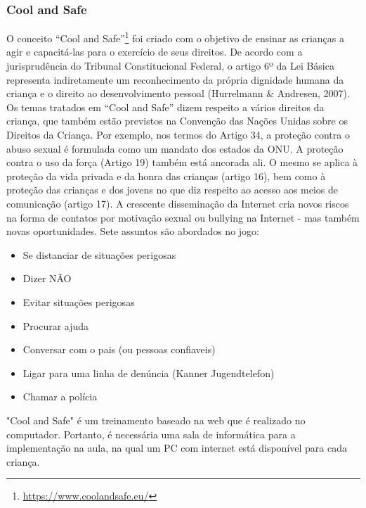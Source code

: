 



\newpage

\subsubsection{Cool and Safe}\label{sssec:CeS}


O conceito “Cool and Safe”\footnote{\url{https://www.coolandsafe.eu/}}  foi criado com o objetivo de ensinar as crianças a agir e capacitá-las para o exercício de seus direitos. De acordo com a jurisprudência do Tribunal Constitucional Federal, o artigo 6º da Lei Básica representa indiretamente um reconhecimento da própria dignidade humana da criança e o direito ao desenvolvimento pessoal (Hurrelmann \& Andresen, 2007). Os temas tratados em “Cool and Safe” dizem respeito a vários direitos da criança, que também estão previstos na Convenção das Nações Unidas sobre os Direitos da Criança. Por exemplo, nos termos do Artigo 34, a proteção contra o abuso sexual é formulada como um mandato dos estados da ONU. A proteção contra o uso da força (Artigo 19) também está ancorada ali. O mesmo se aplica à proteção da vida privada e da honra das crianças (artigo 16), bem como à proteção das crianças e dos jovens no que diz respeito ao acesso aos meios de comunicação (artigo 17). A crescente disseminação da Internet cria novos riscos na forma de contatos por motivação sexual ou bullying na Internet - mas também novas oportunidades. Sete assuntos são abordados no jogo:

\begin{itemize}
  \item Se distanciar de situações perigosas
  \item Dizer NÃO
  \item Evitar situações perigosas
  \item Procurar ajuda
  \item Conversar com o pais (ou pessoas confiaveis)
  \item Ligar para uma linha de denúncia (Kanner Jugendtelefon)
  \item Chamar a polícia
\end{itemize}

"Cool and Safe" é um treinamento baseado na web que é realizado no computador. Portanto, é necessária uma sala de informática para a implementação na aula, na qual um PC com internet está disponível para cada criança.

